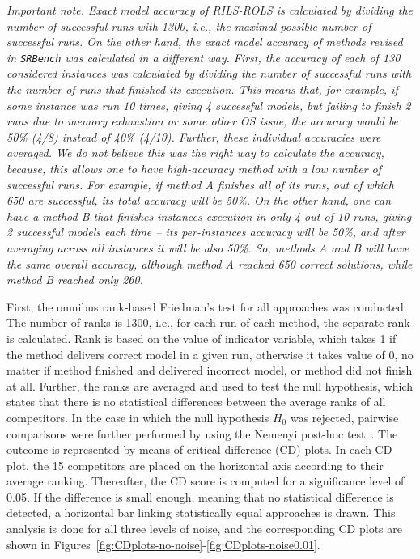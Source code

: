 \documentclass{bmcart}
\begin{document}
\emph{Important note. Exact model accuracy of \textsc{RILS-ROLS} is calculated by dividing the number of successful runs with 1300, i.e., the maximal possible number of successful runs. 
On the other hand, the exact model accuracy of methods revised in \texttt{SRBench} was calculated in a different way. First, the accuracy of each of 130 considered instances was calculated by dividing the number of successful runs with the number of runs that finished its execution. This means that, for example, if some instance was run 10 times, giving 4 successful models, but failing to finish 2 runs due to memory exhaustion or some other OS issue, the accuracy would be 50\% (4/8) instead of 40\% (4/10). Further, these individual accuracies were averaged. 
We do not believe this was the right way to calculate the accuracy, because, this allows one to have high-accuracy method with a low number of successful runs. For example, if method A finishes all of its runs, out of which 650 are successful, its total accuracy will be 50\%. On the other hand, one can have a method B that finishes instances execution in only 4 out of 10 runs, giving 2 successful models each time -- its per-instances accuracy will be 50\%, and after averaging across all instances it will be also 50\%. So, methods A and B will have the same overall accuracy, although method A reached 650 correct solutions, while method B reached only 260.} 

First, the omnibus rank-based Friedman’s test for all approaches was conducted. 
The number of ranks is 1300, i.e., for each run of each method, the separate rank is calculated. Rank is based on the value of indicator variable, which takes 1 if the method delivers correct model in a given run, otherwise it takes value of 0, no matter if method finished and delivered incorrect model, or method did not finish at all.   Further, the ranks are averaged and used to test the null hypothesis, which states that there is no statistical differences between the average ranks of all competitors. 
In the case in which the null hypothesis $H_0$ was rejected, pairwise comparisons were further performed by using the Nemenyi post-hoc test~\cite{pohlert2014pairwise}. The outcome is represented by means of critical difference (CD) plots. In each CD plot, the 15 competitors are placed on the horizontal axis according to their average ranking. Thereafter, the CD score is computed for a significance level of 0.05. If the difference is small enough, meaning that no statistical difference is detected, a horizontal bar linking statistically equal approaches is drawn. This analysis is done for all three levels of noise, and the corresponding CD plots are shown in Figures~\ref{fig:CDplots-no-noise}-\ref{fig:CDplots-noise0.01}. 
\end{document}
